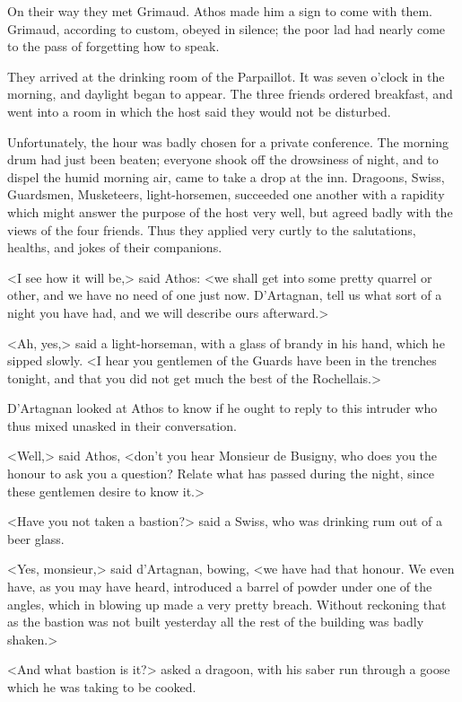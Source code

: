 On their way they met Grimaud. Athos made him a sign to come with them. Grimaud, according to custom, obeyed in silence; the poor lad had nearly come to the pass of forgetting how to speak. 

They arrived at the drinking room of the Parpaillot. It was seven o'clock in the morning, and daylight began to appear. The three friends ordered breakfast, and went into a room in which the host said they would not be disturbed. 

Unfortunately, the hour was badly chosen for a private conference. The morning drum had just been beaten; everyone shook off the drowsiness of night, and to dispel the humid morning air, came to take a drop at the inn. Dragoons, Swiss, Guardsmen, Musketeers, light-horsemen, succeeded one another with a rapidity which might answer the purpose of the host very well, but agreed badly with the views of the four friends. Thus they applied very curtly to the salutations, healths, and jokes of their companions. 

<I see how it will be,> said Athos: <we shall get into some pretty quarrel or other, and we have no need of one just now. D'Artagnan, tell us what sort of a night you have had, and we will describe ours afterward.> 

<Ah, yes,> said a light-horseman, with a glass of brandy in his hand, which he sipped slowly. <I hear you gentlemen of the Guards have been in the trenches tonight, and that you did not get much the best of the Rochellais.> 

D'Artagnan looked at Athos to know if he ought to reply to this intruder who thus mixed unasked in their conversation. 

<Well,> said Athos, <don't you hear Monsieur de Busigny, who does you the honour to ask you a question? Relate what has passed during the night, since these gentlemen desire to know it.> 

<Have you not taken a bastion?> said a Swiss, who was drinking rum out of a beer glass. 

<Yes, monsieur,> said d'Artagnan, bowing, <we have had that honour. We even have, as you may have heard, introduced a barrel of powder under one of the angles, which in blowing up made a very pretty breach. Without reckoning that as the bastion was not built yesterday all the rest of the building was badly shaken.> 

<And what bastion is it?> asked a dragoon, with his saber run through a goose which he was taking to be cooked. 

